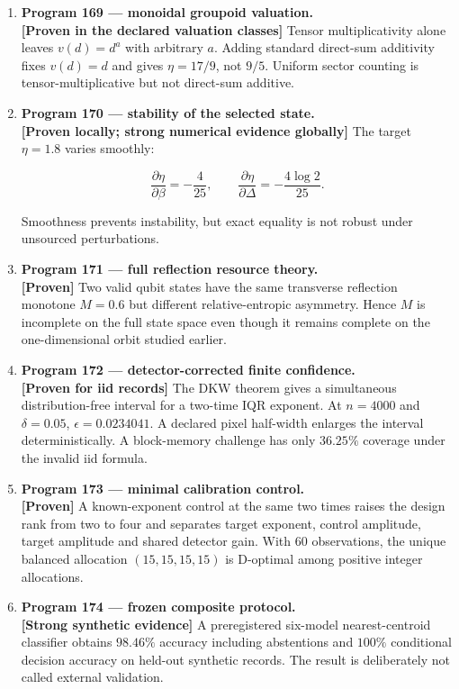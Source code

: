 \documentclass[11pt,a4paper,openany]{report}
\newcommand{\statusProven}{\textcolor{fingreen}{[Proven]}}
\begin{document}
\begin{enumerate}
\item 
\textbf{Program 169 --- monoidal groupoid valuation.}\\
\textbf{[Proven in the declared valuation classes]} Tensor multiplicativity alone leaves \(v(d)=d^a\) with arbitrary \(a\). Adding standard direct-sum additivity fixes \(v(d)=d\) and gives \(\eta=17/9\), not \(9/5\). Uniform sector counting is tensor-multiplicative but not direct-sum additive.

\item 
\textbf{Program 170 --- stability of the selected state.}\\
\textbf{[Proven locally; strong numerical evidence globally]} The target \(\eta=1.8\) varies smoothly:

\[
\frac{\partial\eta}{\partial\beta}=-\frac4{25},\qquad
   \frac{\partial\eta}{\partial\Delta}
   =-\frac{4\log2}{25}.
\]

Smoothness prevents instability, but exact equality is not robust under unsourced perturbations.

\item 
\textbf{Program 171 --- full reflection resource theory.}\\
\textbf{\statusProven{}} Two valid qubit states have the same transverse reflection monotone \(M=0.6\) but different relative-entropic asymmetry. Hence \(M\) is incomplete on the full state space even though it remains complete on the one-dimensional orbit studied earlier.

\item 
\textbf{Program 172 --- detector-corrected finite confidence.}\\
\textbf{[Proven for iid records]} The DKW theorem gives a simultaneous distribution-free interval for a two-time IQR exponent. At \(n=4000\) and \(\delta=0.05\), \(\epsilon=0.0234041\). A declared pixel half-width enlarges the interval deterministically. A block-memory challenge has only \(36.25\%\) coverage under the invalid iid formula.

\item 
\textbf{Program 173 --- minimal calibration control.}\\
\textbf{\statusProven{}} A known-exponent control at the same two times raises the design rank from two to four and separates target exponent, control amplitude, target amplitude and shared detector gain. With \(60\) observations, the unique balanced allocation \((15,15,15,15)\) is D-optimal among positive integer allocations.

\item 
\textbf{Program 174 --- frozen composite protocol.}\\
\textbf{[Strong synthetic evidence]} A preregistered six-model nearest-centroid classifier obtains \(98.46\%\) accuracy including abstentions and \(100\%\) conditional decision accuracy on held-out synthetic records. The result is deliberately not called external validation.


\end{enumerate}
\end{document}
